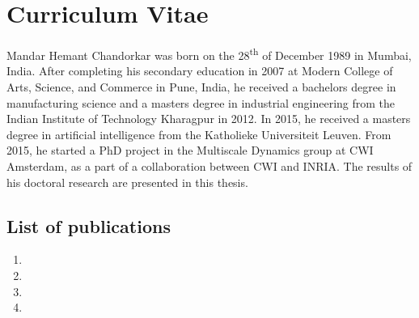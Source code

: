 \chapter*{Curriculum Vitae}\label{chapter:cv}
\thispagestyle{empty}


Mandar Hemant Chandorkar was born on the 28\textsuperscript{th} of December 1989 in Mumbai, India.
After completing his secondary education in 2007 at Modern College of Arts, Science, and Commerce 
in Pune, India, he received a bachelors degree in manufacturing science and a masters degree in 
industrial engineering from the Indian Institute of Technology Kharagpur in 2012. In 2015, he 
received a masters degree in artificial intelligence from the Katholieke Universiteit Leuven. 
%
From 2015, he started a PhD project in the Multiscale Dynamics group at CWI Amsterdam, 
as a part of a collaboration between CWI and INRIA. The results of his doctoral research are 
presented in this thesis.   

\section*{List of publications}

\begin{enumerate}
    \item {}
    \item {}
    \item {}
    \item {}
\end{enumerate}



